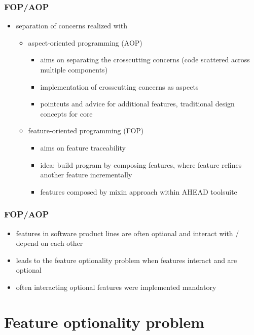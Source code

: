 \documentclass{beamer}
\begin{document}
\begin{frame}
\frametitle{FOP/AOP}
\begin{itemize}
 \item separation of concerns realized with 
\begin{itemize}
\item aspect-oriented programming (AOP) 
\begin{itemize}
\item aims on separating the crosscutting concerns (code scattered across multiple components)
\item implementation of crosscutting concerns as aspects
\item pointcuts and advice for additional features, traditional design concepts for core
\end{itemize}
\end{itemize}
\begin{itemize}
\item feature-oriented programming (FOP)
\begin{itemize}
 \item aims on feature traceability
 \item idea: build program by composing features, where feature refines another feature incrementally
 \item features composed by mixin approach within AHEAD toolsuite
\end{itemize}
\end{itemize}
\end{itemize}
\end{frame}

\begin{frame}
\frametitle{FOP/AOP}
\begin{itemize}
 \item features in software product lines are often optional and interact with / depend on each other 
 \item leads to the feature optionality problem when features interact and are optional
 \item often interacting optional features were implemented mandatory 
\end{itemize}
\end{frame}
\section{Feature optionality problem}
\end{document}
